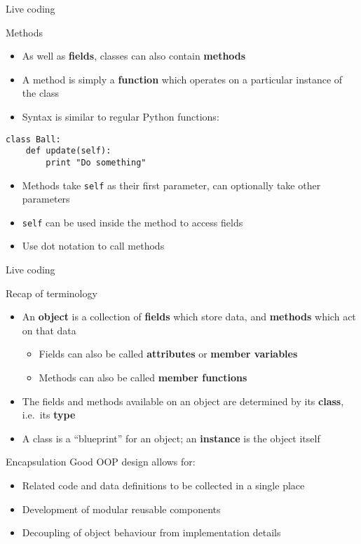 \begin{frame}{Live coding}
\end{frame}

\begin{frame}[fragile]{Methods}
	\begin{itemize}
		\pause\item As well as \textbf{fields}, classes can also contain \textbf{methods}
		\pause\item A method is simply a \textbf{function} which operates on a particular instance of the class
		\pause\item Syntax is similar to regular Python functions:
	\end{itemize}
	\begin{lstlisting}
class Ball:
	def update(self):
		print "Do something"
	\end{lstlisting}
	\begin{itemize}
		\pause\item Methods take \lstinline{self} as their first parameter, can optionally take other parameters
		\pause\item \lstinline{self} can be used inside the method to access fields
		\pause\item Use dot notation to call methods
	\end{itemize}
\end{frame}

\begin{frame}{Live coding}
\end{frame}

\begin{frame}{Recap of terminology}
	\begin{itemize}
		\pause\item An \textbf{object} is a collection of \textbf{fields} which store data,
			and \textbf{methods} which act on that data
			\begin{itemize}
				\pause\item Fields can also be called \textbf{attributes} or \textbf{member variables}
				\pause\item Methods can also be called \textbf{member functions}
			\end{itemize}
		\pause\item The fields and methods available on an object are determined by its \textbf{class}, i.e.\ its \textbf{type}
		\pause\item A class is a ``blueprint'' for an object; an \textbf{instance} is the object itself
	\end{itemize}
\end{frame}

\begin{frame}{Encapsulation}
	Good OOP design allows for:
	\begin{itemize}
		\pause\item Related code and data definitions to be collected in a single place
		\pause\item Development of modular reusable components
		\pause\item Decoupling of object behaviour from implementation details
	\end{itemize}
\end{frame}

